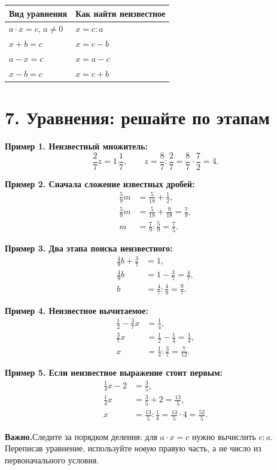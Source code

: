 \documentclass[a4paper,12pt]{article}
\newcommand{\sect}[1]{\section*{\color{darkaccent}#1}}
\newcommand{\remember}[1]{\par\smallskip\noindent\textcolor{darkaccent}{\textbf{Важно.}}\enspace #1\par\smallskip}
\newcommand{\mix}[3]{#1\,\frac{#2}{#3}}
\begin{document}
\renewcommand{\arraystretch}{1.4}
\begin{center}
\begin{tabularx}{\linewidth}{@{}>{\raggedright\arraybackslash}X>{\raggedright\arraybackslash}X@{}}
\toprule
\textbf{Вид уравнения} & \textbf{Как найти неизвестное}\\
\midrule
$a\cdot x=c$, $a\ne0$ & $x=c:a$\\
$x+b=c$ & $x=c-b$\\
$a-x=c$ & $x=a-c$\\
$x-b=c$ & $x=c+b$\\
\bottomrule
\end{tabularx}
\end{center}

\sect{7. Уравнения: решайте по этапам}
\textbf{Пример 1. Неизвестный множитель:}
\[
\frac27z=\mix{1}{1}{7},\qquad
z=\frac87:\frac27=\frac87\cdot\frac72=\boxed4.
\]

\textbf{Пример 2. Сначала сложение известных дробей:}
\begin{align*}
\frac59m&=\frac5{18}+\frac12,\\
\frac59m&=\frac5{18}+\frac9{18}=\frac79,\\
m&=\frac79:\frac59=\boxed{\frac75}.
\end{align*}

\textbf{Пример 3. Два этапа поиска неизвестного:}
\begin{align*}
\frac49b+\frac37&=1,\\
\frac49b&=1-\frac37=\frac47,\\
b&=\frac47:\frac49=\boxed{\frac97}.
\end{align*}

\textbf{Пример 4. Неизвестное вычитаемое:}
\begin{align*}
\frac12-\frac37x&=\frac14,\\
\frac37x&=\frac12-\frac14=\frac14,\\
x&=\frac14:\frac37=\boxed{\frac7{12}}.
\end{align*}

\textbf{Пример 5. Если неизвестное выражение стоит первым:}
\begin{align*}
\frac14x-2&=\frac35,\\
\frac14x&=\frac35+2=\frac{13}{5},\\
x&=\frac{13}{5}:\frac14
=\frac{13}{5}\cdot4=\boxed{\frac{52}{5}}.
\end{align*}
\remember{Следите за порядком деления: для $a\cdot x=c$ нужно вычислить $c:a$. Переписав уравнение, используйте \emph{новую} правую часть, а не число из первоначального условия.}
\end{document}
